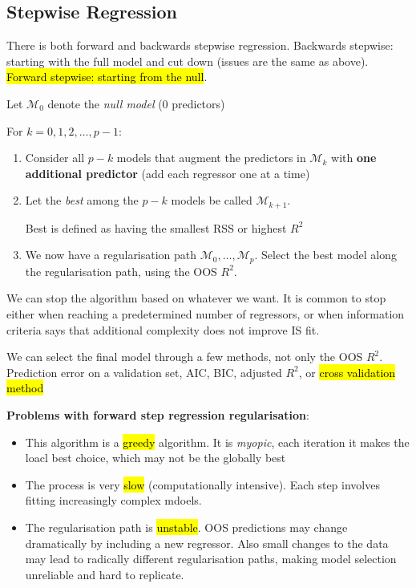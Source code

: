 \documentclass[11pt]{article}
\begin{document}
\subsection{Stepwise Regression}

There is both forward and backwards stepwise regression. Backwards stepwise: starting with the full model and cut down (issues are the same as above). \hl{Forward stepwise: starting from the null}.

\begin{algo}
    \hspace{1in}
    Let $\mathcal{M}_0$ denote the \textit{null model} (0 predictors)

    For $k = 0, 1, 2, \ldots, p-1$:

    \begin{enumerate}
        \item Consider all $p-k$ models that augment the predictors in $\mathcal{M}_k$ with \textbf{one additional predictor} (add each regressor one at a time)
        \item Let the \textit{best} among the $p-k$ models be called $\mathcal{M}_{k+1}$. 
        \begin{note}
            Best is defined as having the smallest RSS or highest $R^2$
        \end{note}
        \item We now have a regularisation path $\mathcal{M}_0, \ldots, \mathcal{M}_p$. Select the best model along the regularisation path, using the OOS $R^2$.
    \end{enumerate}

    We can stop the algorithm based on whatever we want. It is common to stop either when reaching a predetermined number of regressors, or when information criteria says that additional complexity does not improve IS fit.
\end{algo}

\begin{note}
    We can select the final model through a few methods, not only the OOS $R^2$. Prediction error on a validation set, AIC, BIC, adjusted $R^2$, or \hl{cross validation method}
\end{note}

\begin{shaded}
    \textbf{Problems with forward step regression regularisation}:

    \begin{itemize}
        \item This algorithm is a \hl{greedy} algorithm. It is \textit{myopic}, each iteration it makes the loacl best choice, which may not be the globally best
        \item The process is very \hl{slow} (computationally intensive). Each step involves fitting increasingly complex mdoels.
        \item The regularisation path is \hl{unstable}. OOS predictions may change dramatically by including a new regressor. Also small changes to the data may lead to radically different regularisation paths, making model selection unreliable and hard to replicate. 
    \end{itemize}
\end{shaded}
\end{document}
